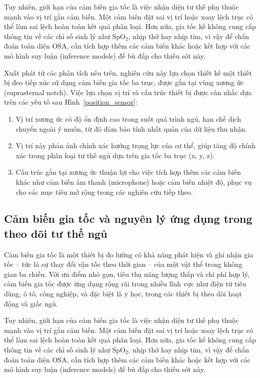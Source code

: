 Tuy nhiên, giới hạn của cảm biến gia tốc là việc nhận diện tư thế phụ 
thuộc mạnh vào vị trí gắn cảm biến. Một cảm biến đặt sai vị trí hoặc 
xoay lệch trục có thể làm sai lệch hoàn toàn kết quả phân loại. 
Hơn nữa, gia tốc kế không cung cấp thông tin về các chỉ số sinh lý 
như $\mathrm{SpO_2}$, nhịp thở hay nhịp tim, vì vậy để chẩn đoán toàn diện OSA, 
cần tích hợp thêm các cảm biến khác hoặc kết hợp với các mô hình 
suy luận (inference models) để bù đắp cho thiếu sót này.

Xuất phát từ các phân tích nêu trên, nghiên cứu này lựa chọn thiết 
kế một thiết bị đeo tiếp xúc sử dụng cảm biến gia tốc ba trục, 
được gắn tại vùng xương ức (suprasternal notch). 
Việc lựa chọn vị trí và cấu trúc thiết bị được cân nhắc dựa trên 
các yếu tố sau Hình~\ref{position_sensor}:

\begin{enumerate}
    \item Vị trí xương ức có độ ổn định cao trong suốt quá trình ngủ, 
		hạn chế dịch chuyển ngoài ý muốn, từ đó đảm bảo tính nhất quán của 
		dữ liệu thu nhận.
    \item Vị trí này phản ánh chính xác hướng trọng lực của cơ thể, 
		giúp tăng độ chính xác trong phân loại tư thế ngủ dựa trên gia 
		tốc ba trục (x, y, z).
    \item Cấu trúc gắn tại xương ức thuận lợi cho việc tích hợp thêm 
		các cảm biến khác như cảm biến âm thanh (microphone) hoặc cảm biến 
		nhiệt độ, phục vụ cho các mục tiêu mở rộng trong các nghiên cứu 
		tiếp theo.
\end{enumerate}


\subsection*{Cảm biến gia tốc và nguyên lý ứng dụng trong theo dõi tư thế ngủ}

Cảm biến gia tốc là một thiết bị đo lường có khả năng phát hiện 
và ghi nhận gia tốc – tức là sự thay đổi vận tốc theo thời gian – 
của một vật thể trong không gian ba chiều. 
Với ưu điểm nhỏ gọn, tiêu thụ năng lượng thấp và chi phí hợp lý, 
cảm biến gia tốc được ứng dụng rộng rãi trong nhiều lĩnh vực 
như điện tử tiêu dùng, ô tô, công nghiệp, và đặc biệt là y học, 
trong các thiết bị theo dõi hoạt động và giấc ngủ.

Tuy nhiên, giới hạn của cảm biến gia tốc là việc nhận diện tư thế phụ 
thuộc mạnh vào vị trí gắn cảm biến. Một cảm biến đặt sai vị trí hoặc 
xoay lệch trục có thể làm sai lệch hoàn toàn kết quả phân loại. 
Hơn nữa, gia tốc kế không cung cấp thông tin về các chỉ số sinh lý 
như $\mathrm{SpO_2}$, nhịp thở hay nhịp tim, vì vậy để chẩn đoán toàn diện OSA, 
cần tích hợp thêm các cảm biến khác hoặc kết hợp với các mô hình 
suy luận (inference models) để bù đắp cho thiếu sót này.

